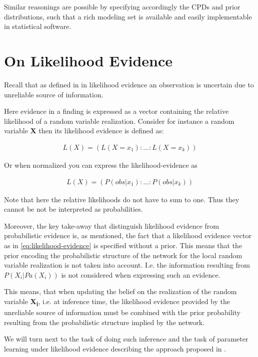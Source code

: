 \documentclass[11pt]{article}
\begin{document}
\begin{article}
Similar reasonings are possible by specifying accordingly the CPDs
and prior distributions, such that a rich modeling set is
available and easily implementable in statistical software.

\section{On Likelihood Evidence}
\label{sec:orgcee63cf}

Recall that as defined in \cite{Mrad_2015} in likelihood evidence an
observation is uncertain due to unreliable source of information.

Here evidence in a finding is expressed as a vector containing the
relative likelihood of a random variable realization. Consider for
instance a random variable \textbf{X} then its likelihood evidence is
defined as:

\begin{align} \label{eq:likelihood-evidence}
 L(X) = (L(X = x_1): ... : L(X = x_k))
\end{align}

Or when normalized you can express the likelihood-evidence as 

\begin{align} \label{eq:normalized-likelihood-evidence}
 L(X) = (P(obs | x_1): ... : P(obs | x_k))
\end{align}

Note that here the relative likelihoods do not have to sum to
one. Thus they cannot be not be interpreted as probabilities.

Moreover, the key take-away that distinguish likelihood evidence
from probabilistic evidence is, as mentioned, the fact that a
likelihood evidence vector as in \ref{eq:likelihood-evidence} is
specified without a prior. This means that the prior encoding the
probabilistic structure of the network for the local random
variable realization is not taken into account. I.e. the
information resulting from \(P(X_i|Pa(X_i))\) is not considered when
expressing such an evidence.

This means, that when updating the belief on the realization of
the random variable \textbf{X\textsubscript{i}}, i.e. at inference time, the likelihood
evidence provided by the unreliable source of information must be
combined with the prior probability resulting from the
probabilistic structure implied by the network.

We will turn next to the task of doing such inference and the task
of parameter learning under likelihood evidence describing the
approach proposed in \cite{Wasserkrug_all}.


\end{article}
\end{document}
